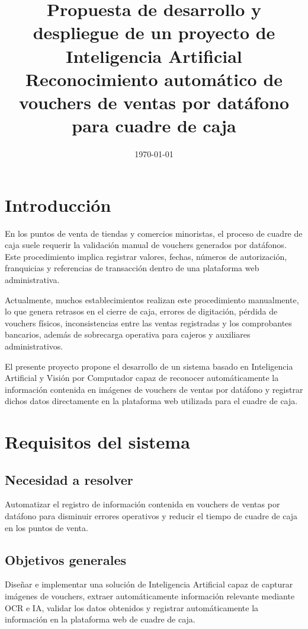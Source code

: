 \documentclass[12pt]{article}
\title{Propuesta de desarrollo y despliegue de un proyecto de Inteligencia Artificial\\
\large Reconocimiento automático de vouchers de ventas por datáfono para cuadre de caja}
\author{}
\date{\today}
\begin{document}
\maketitle

\section{Introducción}

En los puntos de venta de tiendas y comercios minoristas, el proceso de cuadre de caja suele requerir la validación manual de vouchers generados por datáfonos. Este procedimiento implica registrar valores, fechas, números de autorización, franquicias y referencias de transacción dentro de una plataforma web administrativa.

Actualmente, muchos establecimientos realizan este procedimiento manualmente, lo que genera retrasos en el cierre de caja, errores de digitación, pérdida de vouchers físicos, inconsistencias entre las ventas registradas y los comprobantes bancarios, además de sobrecarga operativa para cajeros y auxiliares administrativos.

El presente proyecto propone el desarrollo de un sistema basado en Inteligencia Artificial y Visión por Computador capaz de reconocer automáticamente la información contenida en imágenes de vouchers de ventas por datáfono y registrar dichos datos directamente en la plataforma web utilizada para el cuadre de caja.

\section{Requisitos del sistema}

\subsection{Necesidad a resolver}

Automatizar el registro de información contenida en vouchers de ventas por datáfono para disminuir errores operativos y reducir el tiempo de cuadre de caja en los puntos de venta.

\subsection{Objetivos generales}

Diseñar e implementar una solución de Inteligencia Artificial capaz de capturar imágenes de vouchers, extraer automáticamente información relevante mediante OCR e IA, validar los datos obtenidos y registrar automáticamente la información en la plataforma web de cuadre de caja.
\end{document}
